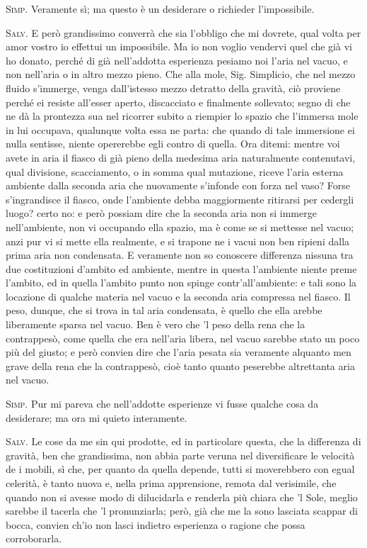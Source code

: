 \documentclass[11pt,twoside,openany]{book}
\newcommand{\speaker}[1]{\textcolor{rubric}{\textsc{#1}}\space}
\begin{document}
\speaker{Simp.} Veramente sì; ma questo è un desiderare o richieder l'impossibile.

\speaker{Salv.} E però grandissimo converrà che sia l'obbligo che mi dovrete, qual volta per amor vostro io effettui un impossibile. Ma io non voglio vendervi quel che già vi ho donato, perché di già nell'addotta esperienza pesiamo noi l'aria nel vacuo, e non nell'aria o in altro mezzo pieno. Che alla mole, Sig. Simplicio, che nel mezzo fluido s'immerge, venga dall'istesso mezzo detratto della gravità, ciò proviene perché ei resiste all'esser aperto, discacciato e finalmente sollevato; segno di che ne dà la prontezza sua nel ricorrer subito a riempier lo spazio che l'immersa mole in lui occupava, qualunque volta essa ne parta: che quando di tale immersione ei nulla sentisse, niente opererebbe egli contro di quella. Ora ditemi: mentre voi avete in aria il fiasco di già pieno della medesima aria naturalmente contenutavi, qual divisione, scacciamento, o in somma qual mutazione, riceve l'aria esterna ambiente dalla seconda aria che nuovamente s'infonde con forza nel vaso? Forse s'ingrandisce il fiasco, onde l'ambiente debba maggiormente ritirarsi per cedergli luogo? certo no: e però possiam dire che la seconda aria non si immerge nell'ambiente, non vi occupando ella spazio, ma è come se si mettesse nel vacuo; anzi pur vi si mette ella realmente, e si trapone ne i vacui non ben ripieni dalla prima aria non condensata. E veramente non so conoscere differenza nissuna tra due costituzioni d'ambito ed ambiente, mentre in questa l'ambiente niente preme l'ambito, ed in quella l'ambito punto non spinge contr'all'ambiente: e tali sono la locazione di qualche materia nel vacuo e la seconda aria compressa nel fiasco. Il peso, dunque, che si trova in tal aria condensata, è quello che ella arebbe liberamente sparsa nel vacuo. Ben è vero che 'l peso della rena che la contrappesò, come quella che era nell'aria libera, nel vacuo sarebbe stato un poco più del giusto; e però convien dire che l'aria pesata sia veramente alquanto men grave della rena che la contrappesò, cioè tanto quanto peserebbe altrettanta aria nel vacuo.

\speaker{Simp.} Pur mi pareva che nell'addotte esperienze vi fusse qualche cosa da desiderare; ma ora mi quieto interamente.

\speaker{Salv.} Le cose da me sin qui prodotte, ed in particolare questa, che la differenza di gravità, ben che grandissima, non abbia parte veruna nel diversificare le velocità de i mobili, sì che, per quanto da quella depende, tutti si moverebbero con egual celerità, è tanto nuova e, nella prima apprensione, remota dal verisimile, che quando non si avesse modo di dilucidarla e renderla più chiara che 'l Sole, meglio sarebbe il tacerla che 'l pronunziarla; però, già che me la sono lasciata scappar di bocca, convien ch'io non lasci indietro esperienza o ragione che possa corroborarla.
\end{document}
